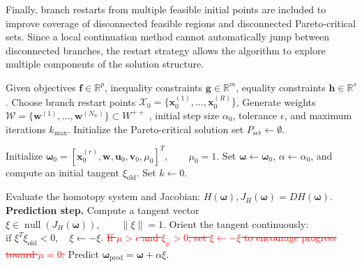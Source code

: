 \documentclass[11pt,pdflatex,sn-mathphys-ay]{sn-jnl}%
\theoremstyle{definition}
\theoremstyle{thmstyleone}%
\theoremstyle{thmstyletwo}%
\theoremstyle{thmstylethree}%
\newcommand{\del}[1]{\textcolor{red}{\sout{#1}}}
\newcommand{\add}[1]{\textcolor{revisionblue}{#1}}
\begin{document}
	Finally, branch restarts from multiple feasible initial points are included to improve coverage of disconnected feasible regions and disconnected Pareto-critical sets. 
	Since a local continuation method cannot automatically jump between disconnected branches, the restart strategy allows the algorithm to explore multiple components of the solution structure.
	\begin{algorithm}[htbp]
		\caption{Robust Pseudo-Arclength Homotopy Continuation Method}
		\label{alg:robust_homotopy}
		\begin{algorithmic}[1]
			\STATE Given objectives $\bm f\in\mathbb{R}^p$, inequality constraints $\bm g\in\mathbb{R}^m$, equality constraints $\bm h\in\mathbb{R}^s$.
			\STATE Choose branch restart points $\mathcal X_0=\{\bm x_0^{(1)},\dots,\bm x_0^{(R)}\}$, \add{Generate} weights $\mathcal W=\{\bm w^{(1)},\dots,\bm w^{(N_w)}\}$\add{$\subset
				W^{++}$} , initial step size $\alpha_0$, tolerance $\epsilon$, and maximum iterations $k_{\max}$.
			\STATE Initialize the Pareto-critical solution set $P_{\mathrm{set}}\gets\emptyset$.
			
			\STATE Initialize
			$\bm{\omega}_0=\left[\bm x_0^{(r)},\bm w,\bm u_0,\bm v_0,\mu_0\right]^T,
			\qquad \mu_0=1.$    
			\STATE Set $\bm{\omega}\gets\bm{\omega}_0$, $\alpha\gets\alpha_0$, and compute an initial tangent $\xi_{\mathrm{old}}$.
			\STATE Set $k\gets0$.
			
			\STATE Evaluate the homotopy system and Jacobian: $H(\bm{\omega}), J_H(\bm{\omega})=DH(\bm{\omega}).$
			\STATE \textbf{Prediction step.}
			\STATE Compute a tangent vector
			$\xi\in\operatorname{null}(J_H(\bm{\omega})),
			\qquad \|\xi\|=1.$
			\STATE Orient the tangent continuously:
			$\text{if } \xi^T\xi_{\mathrm{old}}<0,\quad \xi\gets-\xi.$
			\del{If $\mu>\epsilon$ and $\xi_\mu>0$, set $\xi\gets-\xi$ to encourage progress toward $\mu=0$.}
			\STATE Predict $\bm{\omega}_{\mathrm{pred}}=\bm{\omega}+\alpha\xi.$
			

\end{algorithmic}
\end{algorithm}
\end{document}
